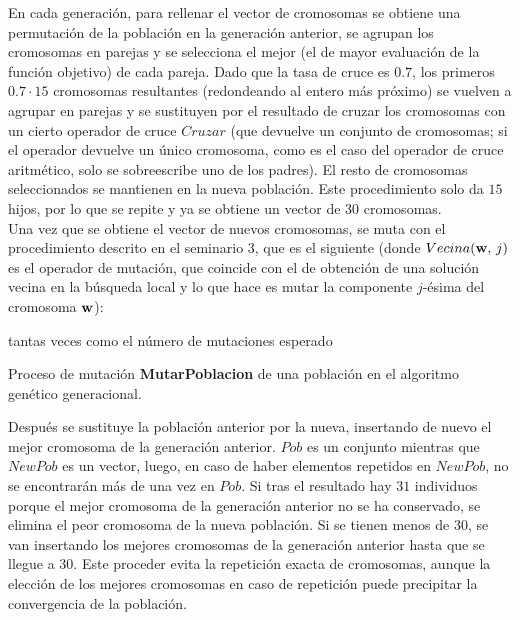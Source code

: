 \documentclass{article}
\newenvironment{algo}{
	\vspace*{0.5cm}
	\begin{algorithm}[H]}{
	\end{algorithm}
	\vspace*{0.5cm}
}
\begin{document}
En cada generación, para rellenar el vector de cromosomas se obtiene una permutación de la población en la generación anterior, se agrupan los cromosomas en parejas y se selecciona el mejor (el de mayor evaluación de la función objetivo) de cada pareja. Dado que la tasa de cruce es $0.7$, los primeros $0.7 \cdot 15$ cromosomas resultantes (redondeando al entero más próximo) se vuelven a agrupar en parejas y se sustituyen por el resultado de cruzar los cromosomas con un cierto operador de cruce $Cruzar$ (que devuelve un conjunto de cromosomas; si el operador devuelve un único cromosoma, como es el caso del operador de cruce aritmético, solo se sobreescribe uno de los padres). El resto de cromosomas seleccionados se mantienen en la nueva población. Este procedimiento solo da $15$ hijos, por lo que se repite y ya se obtiene un vector de $30$ cromosomas. \\

Una vez que se obtiene el vector de nuevos cromosomas, se muta con el procedimiento descrito en el seminario 3, que es el siguiente (donde $Vecina(\textbf w,\,j)$ es el operador de mutación, que coincide con el de obtención de una solución vecina en la búsqueda local y lo que hace es mutar la componente $j$-ésima del cromosoma $\textbf w$):

\begin{algo}
	\label{mutar-pob}

	 tantas veces como el número de mutaciones esperado\;

	\vspace{0.2cm}
	\caption{Proceso de mutación \textbf{MutarPoblacion} de una población en el algoritmo genético generacional.}
\end{algo}


Después se sustituye la población anterior por la nueva, insertando de nuevo el mejor cromosoma de la generación anterior. $Pob$ es un conjunto mientras que $NewPob$ es un vector, luego, en caso de haber elementos repetidos en $NewPob$, no se encontrarán más de una vez en $Pob$. Si tras el resultado hay $31$ individuos porque el mejor cromosoma de la generación anterior no se ha conservado, se elimina el peor cromosoma de la nueva población. Si se tienen menos de $30$, se van insertando los mejores cromosomas de la generación anterior hasta que se llegue a $30$. Este proceder evita la repetición exacta de cromosomas, aunque la elección de los mejores cromosomas en caso de repetición puede precipitar la convergencia de la población.
\end{document}
